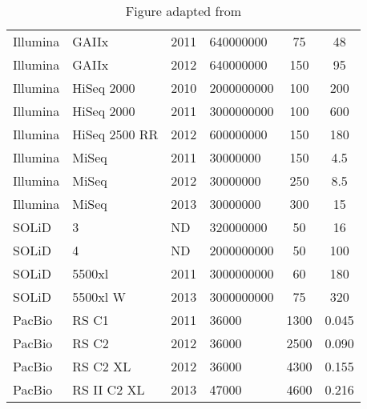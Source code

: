 \begin{table}
{\begin{tabular}{llllcc}
Illumina   & GAIIx           & 2011 & 640000000     & 75                            & 48                        \\
Illumina   & GAIIx           & 2012 & 640000000     & 150                           & 95                        \\
Illumina   & HiSeq 2000      & 2010 & 2000000000    & 100                           & 200                       \\
Illumina   & HiSeq 2000      & 2011 & 3000000000    & 100                           & 600                       \\
Illumina   & HiSeq 2500 RR   & 2012 & 600000000     & 150                           & 180                       \\
Illumina   & MiSeq           & 2011 & 30000000      & 150                           & 4.5                       \\
Illumina   & MiSeq           & 2012 & 30000000      & 250                           & 8.5                       \\
Illumina   & MiSeq           & 2013 & 30000000      & 300                           & 15                        \\
SOLiD      & 3               & ND   & 320000000     & 50                            & 16                        \\
SOLiD      & 4               & ND   & 2000000000    & 50                            & 100                       \\
SOLiD      & 5500xl          & 2011 & 3000000000    & 60                            & 180                       \\
SOLiD      & 5500xl W        & 2013 & 3000000000    & 75                            & 320                       \\
PacBio     & RS C1           & 2011 & 36000         & 1300                          & 0.045                     \\
PacBio     & RS C2           & 2012 & 36000         & 2500                          & 0.090                     \\
PacBio     & RS C2 XL        & 2012 & 36000         & 4300                          & 0.155                     \\
PacBio     & RS II C2 XL     & 2013 & 47000         & 4600                          & 0.216                    \\
\bottomrule
\end{tabular}}
\caption[Current HTS Sequencing Platforms]{Figure adapted from \citep{developmentinNGS:2012bs}}
\label{tab:table3_1}
\end{table}